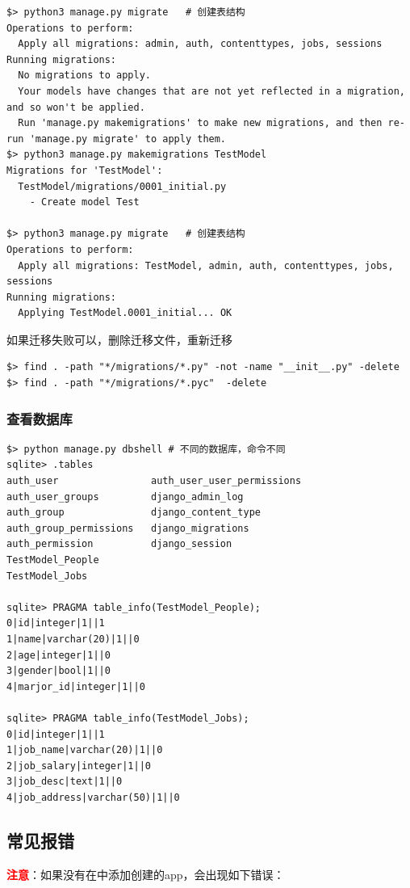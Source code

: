 \begin{lstlisting}[style=demostyle,numbers=none]
$> python3 manage.py migrate   # 创建表结构
Operations to perform:
  Apply all migrations: admin, auth, contenttypes, jobs, sessions
Running migrations:
  No migrations to apply.
  Your models have changes that are not yet reflected in a migration, and so won't be applied.
  Run 'manage.py makemigrations' to make new migrations, and then re-run 'manage.py migrate' to apply them.
$> python3 manage.py makemigrations TestModel
Migrations for 'TestModel':
  TestModel/migrations/0001_initial.py
    - Create model Test

$> python3 manage.py migrate   # 创建表结构
Operations to perform:
  Apply all migrations: TestModel, admin, auth, contenttypes, jobs, sessions
Running migrations:
  Applying TestModel.0001_initial... OK
\end{lstlisting}  

如果迁移失败可以，删除迁移文件，重新迁移
\begin{lstlisting}[style=demostyle,numbers=none]
$> find . -path "*/migrations/*.py" -not -name "__init__.py" -delete
$> find . -path "*/migrations/*.pyc"  -delete
\end{lstlisting}

\subsubsection{查看数据库}
\begin{lstlisting}[style=demostyle,numbers=none]
$> python manage.py dbshell # 不同的数据库，命令不同
sqlite> .tables
auth_user                auth_user_user_permissions
auth_user_groups         django_admin_log
auth_group               django_content_type
auth_group_permissions   django_migrations
auth_permission          django_session
TestModel_People
TestModel_Jobs

sqlite> PRAGMA table_info(TestModel_People);
0|id|integer|1||1
1|name|varchar(20)|1||0
2|age|integer|1||0
3|gender|bool|1||0
4|marjor_id|integer|1||0

sqlite> PRAGMA table_info(TestModel_Jobs);
0|id|integer|1||1
1|job_name|varchar(20)|1||0
2|job_salary|integer|1||0
3|job_desc|text|1||0
4|job_address|varchar(50)|1||0
\end{lstlisting}          


\subsection{常见报错}
\textcolor{red}{\textbf{注意}}：如果没有在中添加创建的app，会出现如下错误：

